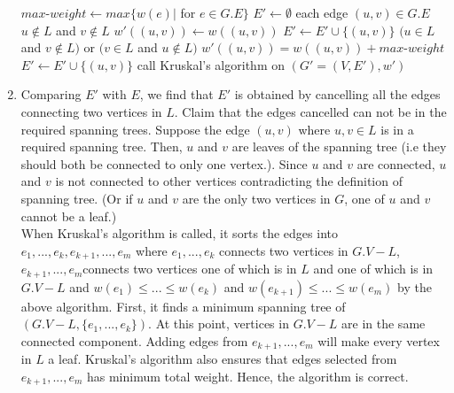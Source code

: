 \documentclass[11pt]{article}
\begin{document}
\begin{enumerate}[label=(\alph*)]
\begin{codebox}
\li $max$-$weight \gets max\{w(e)|$ for $e\in G.E\}$
\li $E' \gets \emptyset$
\li \For each edge $(u, v)\in G.E$
\li      \Then \If $u \notin L$ and $v \notin L$
             \Then
\li                   $w'((u, v)) \gets w((u, v))$
\li                   $E' \gets E' \cup \{(u, v)\}$
\li      \ElseIf $(u \in L$ and $v \notin L)$ or $(v \in L$ and $u \notin L)$
\li                 \Then $w'((u, v)) = w((u, v )) + max$-$weight$\li$E' \gets E' \cup \{(u, v)\}$\End
\End
\li       call Kruskal's algorithm on $(G'=(V, E'), w')$
\end{codebox}

\item
Comparing $E'$ with $E$, we find that $E'$ is obtained by cancelling all the edges connecting two vertices in $L$. Claim that the edges cancelled can not be in the required spanning trees. Suppose the edge $(u, v)$ where $u, v \in L$ is in a required spanning tree. Then, $u$ and $v$ are leaves of the spanning tree (i.e they should both be connected to only one vertex.). Since $u$ and $v$ are connected, $u$ and $v$ is not connected to other vertices contradicting the definition of spanning tree. (Or if $u$ and $v$ are the only two vertices in $G$, one of $u$ and $v$ cannot be a leaf.)\\
When Kruskal's algorithm is called, it sorts the edges into $e_1, ..., e_k, e_{k+1},...,  e_{m}$ where $e_1, ..., e_k $ connects two vertices in $ G.V - L$, $e_{k+1},..., e_{m} $connects two vertices one of which is in $ L$ and one of which is in $G.V - L$ and $w(e_1)\leq ... \leq w(e_k)$ and $w(e_{k+1})\leq ... \leq w(e_m)$ by the above algorithm. First, it finds a minimum spanning tree of $(G.V-L, \{e_1, ..., e_k\})$. At this point, vertices in $G.V - L$ are in the same connected component. Adding edges from $e_{k+1}, ..., e_{m}$ will make every vertex in $L$ a leaf. Kruskal's algorithm also ensures that edges selected from $e_{k+1}, ..., e_{m}$ has minimum total weight. Hence, the algorithm is correct.

\end{enumerate}
\end{document}
